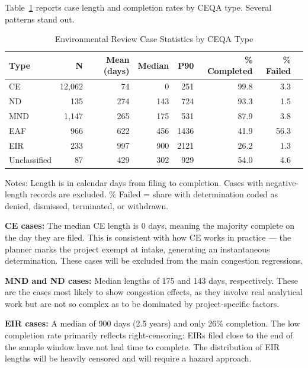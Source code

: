 \documentclass[12pt]{article}
\begin{document}
Table~\ref{tab:stats_by_type} reports case length and completion rates by CEQA type. Several patterns stand out.

\begin{table}[H]
\centering
\begin{threeparttable}
\caption{Environmental Review Case Statistics by CEQA Type}
\label{tab:stats_by_type}
\begin{tabular}{lrrrrrrr}
\toprule
Type & N & Mean (days) & Median & P90 & \% Completed & \% Failed \\
\midrule
CE           & 12,062 &  74 &   0 &  251 & 99.8 &  3.3 \\
ND           &    135 & 274 & 143 &  724 & 93.3 &  1.5 \\
MND          &  1,147 & 265 & 175 &  531 & 87.9 &  3.8 \\
EAF          &    966 & 622 & 456 & 1436 & 41.9 & 56.3 \\
EIR          &    233 & 997 & 900 & 2121 & 26.2 &  1.3 \\
Unclassified &     87 & 429 & 302 &  929 & 54.0 &  4.6 \\
\bottomrule
\end{tabular}
\begin{tablenotes}
  \small
  \item Notes: Length is in calendar days from filing to completion. Cases with negative-length records are excluded. \% Failed = share with determination coded as denied, dismissed, terminated, or withdrawn.
\end{tablenotes}
\end{threeparttable}
\end{table}

\textbf{CE cases:} The median CE length is 0 days, meaning the majority complete on the day they are filed. This is consistent with how CE works in practice --- the planner marks the project exempt at intake, generating an instantaneous determination. These cases will be excluded from the main congestion regressions.

\textbf{MND and ND cases:} Median lengths of 175 and 143 days, respectively. These are the cases most likely to show congestion effects, as they involve real analytical work but are not so complex as to be dominated by project-specific factors.

\textbf{EIR cases:} A median of 900 days (2.5 years) and only 26\% completion. The low completion rate primarily reflects right-censoring: EIRs filed close to the end of the sample window have not had time to complete. The distribution of EIR lengths will be heavily censored and will require a hazard approach.
\end{document}
